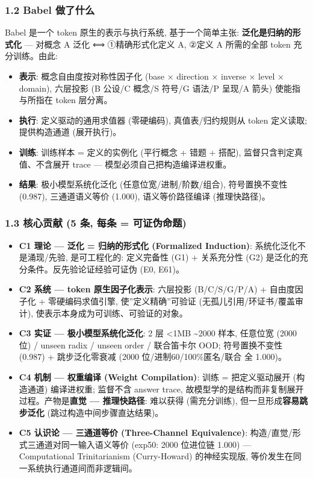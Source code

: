 \documentclass[
]{article}
\providecommand{\tightlist}{%
  \setlength{\itemsep}{0pt}\setlength{\parskip}{0pt}}
\begin{document}
\subsubsection{1.2 Babel 做了什么}\label{babel-ux505aux4e86ux4ec0ux4e48}

Babel 是一个 token 原生的表示与执行系统, 基于一个简单主张:
\textbf{泛化是归纳的形式化} --- 对概念 A 泛化 ⟺ ①精确形式化定义 A, ②定义
A 所需的全部 token 充分训练。由此:

\begin{itemize}
\tightlist
\item
  \textbf{表示}: 概念自由度按对称性因子化 (base × direction × inverse ×
  level × domain), 六层投影 (B 公设/C 概念/S 符号/G 语法/P 呈现/A 箭头)
  使能指与所指在 token 层分离。
\item
  \textbf{执行}: 定义驱动的通用求值器 (零硬编码), 真值表/归约规则从
  token 定义读取; 提供构造通道 (展开执行)。
\item
  \textbf{训练}: 训练样本 = 定义的实例化 (平行概念 + 错题 + 搭配),
  监督只含判定真值、不含展开 trace --- 模型必须自己把构造编译进权重。
\item
  \textbf{结果}: 极小模型系统化泛化 (任意位宽/进制/阶数/组合),
  符号置换不变性 (0.987), 三通道语义等价 (1.000), 语义等价路径编译
  (推理快路径)。
\end{itemize}

\subsubsection{1.3 核心贡献 (5 条, 每条 =
可证伪命题)}\label{ux6838ux5fc3ux8d21ux732e-5-ux6761-ux6bcfux6761-ux53efux8bc1ux4f2aux547dux9898}

\begin{itemize}
\tightlist
\item
  \textbf{C1 理论 --- 泛化 = 归纳的形式化 (Formalized Induction)}:
  系统化泛化不是涌现/先验, 是可工程化的: 定义完备性 (G1) + 关系充分性
  (G2) 是泛化的充分条件。反先验论证经验可证伪 (E0, E61)。
\item
  \textbf{C2 系统 --- token 原生因子化表示}: 六层投影 (B/C/S/G/P/A) +
  自由度因子化 + 零硬编码求值引擎, 使''定义精确''可验证
  (无孤儿引用/环证书/覆盖审计), 使表示本身成为可训练、可验证的对象。
\item
  \textbf{C3 实证 --- 极小模型系统化泛化}: 2 层 \textless1MB
  \textasciitilde2000 样本, 任意位宽 (2000 位) / unseen radix / unseen
  order / 联合笛卡尔 OOD; 符号置换不变性 (0.987) + 跳步泛化零衰减 (2000
  位/进制60/100\%匿名/联合 全 1.000)。
\item
  \textbf{C4 机制 --- 权重编译 (Weight Compilation)}: 训练 =
  把定义驱动展开 (构造通道) 编译进权重; 监督不含 answer trace,
  故模型学的是结构而非复制展开过程。产物是\textbf{直觉 --- 推理快路径}:
  难以获得 (需充分训练), 但一旦形成\textbf{容易跳步泛化}
  (跳过构造中间步骤直达结果)。
\item
  \textbf{C5 认识论 --- 三通道等价 (Three-Channel Equivalence)}:
  构造/直觉/形式三通道对同一输入语义等价 (exp50: 2000 位进位链 1.000)
  --- Computational Trinitarianism (Curry-Howard) 的神经实现版,
  等价发生在同一系统执行通道间而非逻辑间。
\end{itemize}
\end{document}
